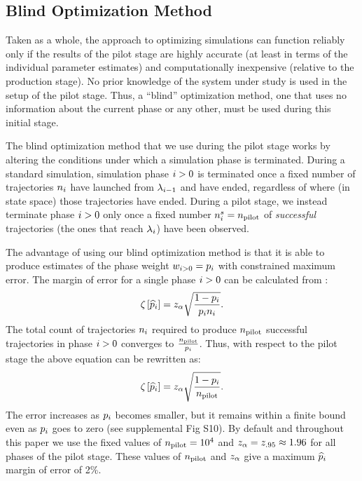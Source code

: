 %
%
%
%

\subsection{Blind Optimization Method}
\label{sec:blind_opt}
Taken as a whole, the  approach to optimizing simulations can function reliably only if the results of the pilot stage are highly accurate (at least in terms of the individual parameter estimates) and computationally inexpensive (relative to the production stage). No prior knowledge of the system under study is used in the setup of the pilot stage. Thus, a ``blind'' optimization method, one that uses no information about the current phase or any other, must be used during this initial stage.

The blind optimization method that we use during the  pilot stage works by altering the conditions under which a simulation phase is terminated. During a standard  simulation, simulation phase $i>0$ is terminated once a fixed number of trajectories $n_{i}$ have launched from ${\lambda}_{i - 1}$ and have ended, regardless of where (in state space) those trajectories have ended. During a pilot stage, we instead terminate phase $i>0$ only once a fixed number $n_{i}^{s} = n_{\textrm{pilot}}$ of \textit{successful} trajectories (\ie the ones that reach ${\lambda}_{i}$) have been observed.

The advantage of using our blind optimization method is that it is able to produce estimates of the phase weight $w_{i>0} = p_{i}$ with constrained maximum error. The margin of error for a single phase $i>0$ can be calculated from :
    \begin{equation*}
        {\zeta}_{} \left[ \widehat{p}_{i} \right] = z_{\alpha} \sqrt{\frac{1 - p_{i}}{p_{i} n_{i}}}.
    \end{equation*}
The total count of trajectories $n_{i}$ required to produce $n_{\textrm{pilot}}$ successful trajectories in phase $i>0$ converges to $\frac{n_{\textrm{pilot}}}{p_{i}}$. Thus, with respect to the pilot stage the above equation can be rewritten as:
\begin{equation}
    \label{eq:blind_opt_moe}
        {\zeta}_{} \left[ \widehat{p}_{i} \right] = z_{\alpha} \sqrt{\frac{1 - p_{i}}{n_{\textrm{pilot}}}}.
    \end{equation}
The error increases as $p_{i}$ becomes smaller, but it remains within a finite bound even as $p_{i}$ goes to zero (see supplemental Fig S10). By default and throughout this paper we use the fixed values of $n_{\textrm{pilot}} = 10^4$ and $z_{\alpha} = z_{.95} \approx 1.96$ for all phases of the pilot stage. These values of $n_{\textrm{pilot}}$ and $z_{\alpha}$ give a maximum $\widehat{p}_{i}$ margin of error of 2\%.

